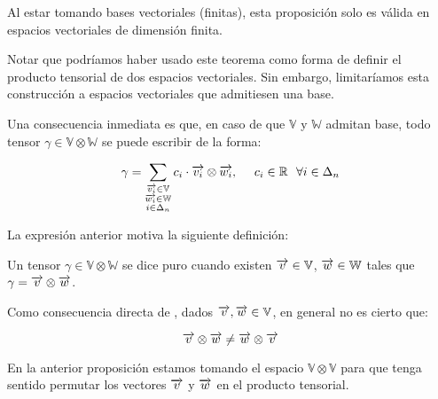 \begin{observacion}
    Al estar tomando bases vectoriales (finitas), esta proposición solo es válida en espacios vectoriales de dimensión finita.
\end{observacion}

\begin{observacion}
    Notar que podríamos haber usado este teorema como forma de definir el producto tensorial de dos espacios vectoriales. Sin embargo, limitaríamos esta construcción a espacios vectoriales que admitiesen una base.
\end{observacion}

Una consecuencia inmediata es que, en caso de que $\mathbb{V}$ y $\mathbb{W}$ admitan base, todo tensor $\gamma \in \mathbb{V} \otimes \mathbb{W}$ se puede escribir de la forma:

\begin{equation}
    \gamma = \sum_{\substack{\overrightarrow{v_i} \in \mathbb{V}\\ \overrightarrow{w_i} \in \mathbb{W}\\ i \in \Delta_{n}}} c_{i} \cdot \overrightarrow{v_i} \otimes \overrightarrow{w_i}, \ \ \ \  c_i \in \mathbb{R} \ \  \forall i \in \Delta_{n}
\end{equation}

La expresión anterior motiva la siguiente definición:

\begin{definicion}
    Un tensor $\gamma \in \mathbb{V} \otimes \mathbb{W}$ se dice puro cuando existen $\overrightarrow{v} \in \mathbb{V}$, $\overrightarrow{w} \in \mathbb{W}$ tales que $\gamma = \overrightarrow{v} \otimes \overrightarrow{w}$.
\end{definicion}

\begin{proposicion}
    Como consecuencia directa de , dados $\overrightarrow{v}, \overrightarrow{w} \in \mathbb{V}$, en general no es cierto que:

    \begin{equation}
        \overrightarrow{v} \otimes \overrightarrow{w} \neq \overrightarrow{w} \otimes \overrightarrow{v}
    \end{equation}

    \begin{observacion}
        En la anterior proposición estamos tomando el espacio $\mathbb{V} \otimes \mathbb{V}$ para que tenga sentido permutar los vectores $\overrightarrow{v}$ y $\overrightarrow{w}$ en el producto tensorial.
    \end{observacion}
\end{proposicion}


